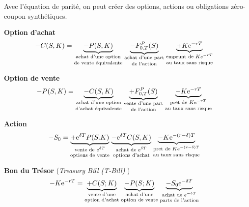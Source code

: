 \documentclass[10pt, french]{article}
\begin{document}
\begin{multicols*}{2}
Avec l'équation de parité, on peut créer des options, actions ou obligations zéro-coupon synthétiques.

\textbf{Option d'achat}
\begin{align*}
	-C(S, K)	
	&=	\underset{\text{\shortstack{achat d'une option\\ de vente équivalente}}}{\underbrace{-P(S, K)}} \;
		\underset{\text{\shortstack{achat d'une part\\ de l'action}}}{\underbrace{-F_{0, T}^{P}(S)}} \;
		\underset{\text{\shortstack{emprunt de $Ke^{-rT}$\\ au taux sans risque}}}{\underbrace{+K\textrm{e}^{-rT}}}
\end{align*}

\textbf{Option de vente}
\begin{align*}
	-P(S, K)	
	&=	\underset{\text{\shortstack{achat d'une option\\ d'achat équivalente}}}{\underbrace{-C(S, K)}} \;
		\underset{\text{\shortstack{vente d'une part\\ de l'action}}}{\underbrace{+F_{0, T}^{P}(S)}} \;
		\underset{\text{\shortstack{pret de $Ke^{-rT}$\\ au taux sans risque}}}{\underbrace{-K\textrm{e}^{-rT}}}
\end{align*}

\textbf{Action}
\begin{align*}
	-S_{0}
	&=	\underset{\text{\shortstack{vente de $e^{\delta T}$\\ options de vente}}}{\underbrace{+\textrm{e}^{\delta T} P(S. K)}} \;
		\underset{\text{\shortstack{achat de $e^{\delta T}$\\ options d'achat}}}{\underbrace{-\textrm{e}^{\delta T} C(S, K)}} \;
		\underset{\text{\shortstack{pret de $Ke^{-(r - \delta)T}$\\ au taux sans risque}}}{\underbrace{-K\textrm{e}^{-(r - \delta)T}}}
\end{align*}

\textbf{Bon du Trésor} (\og \textit{Treasury Bill (T-Bill)} \fg{})
\begin{align*}
	-K \textrm{e}^{-r T}
	&=	\underset{\text{\shortstack{vente d'une\\ option d'achat}}}{\underbrace{+C(S; K)}} \;
		\underset{\text{\shortstack{achat d'une\\ option de vente}}}{\underbrace{-P(S; K)}} \;
		\underset{\text{\shortstack{achat de $e^{-\delta T}$\\ parts de l'action}}}{\underbrace{-S_{0}\textrm{e}^{-\delta T}}}
\end{align*}


\end{multicols*}
\end{document}
